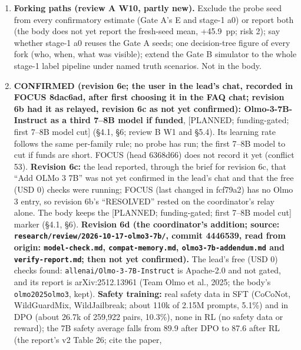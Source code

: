 \documentclass{article}
\theoremstyle{plain}
\theoremstyle{definition}
\theoremstyle{remark}
\begin{document}
\begin{enumerate}
        benefit $\Lambda$ $-$ $\lambda$$\cdot$C(m) over a range of $\lambda$).
        Not in the body.
  \item \textbf{Forking paths (review A W10, partly new).} Exclude the probe
        seed from every confirmatory estimate (Gate A's E and stage-1 a0) or
        report both (the body does not yet report the fresh-seed mean, +45.9~pp;
        risk 2); say whether stage-1 a0 reuses the Gate A seeds; one
        decision-tree figure of every fork (who, when, what was visible); extend
        the Gate B simulator to the whole stage-1 label pipeline under named
        truth scenarios. Not in the body.
  \item \textbf{CONFIRMED (revision 6e; the user in the lead's chat, recorded in
        FOCUS 8dac6ad, after first choosing it in the FAQ chat; revision 6b had
        it as relayed, revision 6c as not yet confirmed): Olmo-3-7B-Instruct as
        a third 7--8B model if funded}, [PLANNED; funding-gated; first 7--8B
        model cut] (\S{}4.1, \S{}6; review B W1 and \S{}5.4). Its learning rate
        follows the same per-family rule; no probe has run; the first 7--8B
        model to cut if funds are short. FOCUS (head 6368d66) does not record it
        yet (conflict 53). \textbf{Revision 6c:} the lead reported, through the
        brief for revision 6c, that ``Add OLMo 3 7B'' was not yet confirmed in
        the lead's chat and that the free (USD 0) checks were running; FOCUS
        (last changed in fcf79a2) has no Olmo 3 entry, so revision 6b's
        ``RESOLVED'' rested on the coordinator's relay alone. The body keeps the
        [PLANNED; funding-gated; first 7--8B model cut] marker (\S{}4.1, \S{}6).
        \textbf{Revision 6d (the coordinator's addition; source:
        \nolinkurl{research/review/2026-10-17-olmo3-7b/}, commit 4446539, read
        from origin: \nolinkurl{model-check.md}, \nolinkurl{compat-memory.md},
        \nolinkurl{olmo3-7b-addendum.md} and \nolinkurl{verify-report.md}; then
        not yet confirmed).} The lead's free (USD 0) checks found:
        \nolinkurl{allenai/Olmo-3-7B-Instruct} is Apache-2.0 and not gated, and
        its report is arXiv:2512.13961 (Team Olmo et al., 2025; the body's
        \texttt{olmo2025olmo3}, kept). \textbf{Safety training:} real safety
        data in SFT (CoCoNot, WildGuardMix, WildJailbreak; about 110k of 2.15M
        prompts, 5.1\%) and in DPO (about 26.7k of 259,922 pairs, 10.3\%), none
        in RL (no safety data or reward); the 7B safety average falls from 89.9
        after DPO to 87.6 after RL (the report's v2 Table 26; cite the paper,
$$
\end{enumerate}
\end{document}
